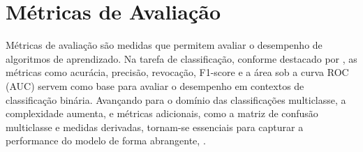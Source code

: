 




\section{Métricas de Avaliação}

Métricas de avaliação são medidas que permitem avaliar o desempenho de algoritmos de aprendizado.  Na tarefa de classificação, conforme destacado por \cite{tharwat2018}, as métricas como acurácia, precisão, revocação, F1-score e a área sob a curva ROC (AUC) servem como base para avaliar o desempenho em contextos de classificação binária.  
Avançando para o domínio das classificações multiclasse, a complexidade aumenta, e métricas adicionais, como a matriz de confusão multiclasse e medidas derivadas, tornam-se essenciais para capturar a performance do modelo de forma abrangente, \cite{grandini2020metrics}.

